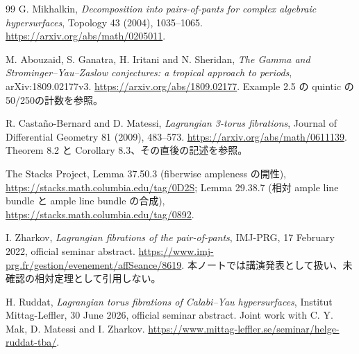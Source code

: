 \documentclass[11pt,a4paper]{article}
\theoremstyle{definition}
\begin{document}
\begin{thebibliography}{99}
G. Mikhalkin,
\emph{Decomposition into pairs-of-pants for complex algebraic hypersurfaces},
Topology 43 (2004), 1035--1065.
\url{https://arxiv.org/abs/math/0205011}.

M. Abouzaid, S. Ganatra, H. Iritani and N. Sheridan,
\emph{The Gamma and Strominger--Yau--Zaslow conjectures: a tropical approach to periods},
arXiv:1809.02177v3.
\url{https://arxiv.org/abs/1809.02177}.
Example 2.5 の quintic の50/250の計数を参照。

R. Castaño-Bernard and D. Matessi,
\emph{Lagrangian 3-torus fibrations},
Journal of Differential Geometry 81 (2009), 483--573.
\url{https://arxiv.org/abs/math/0611139}.
Theorem 8.2 と Corollary 8.3、その直後の記述を参照。

The Stacks Project, Lemma 37.50.3 (fiberwise ampleness の開性),
\url{https://stacks.math.columbia.edu/tag/0D2S};
Lemma 29.38.7 (相対 ample line bundle と ample line bundle の合成),
\url{https://stacks.math.columbia.edu/tag/0892}.

I. Zharkov, \emph{Lagrangian fibrations of the pair-of-pants},
IMJ-PRG, 17 February 2022, official seminar abstract.
\url{https://www.imj-prg.fr/gestion/evenement/affSeance/8619}.
本ノートでは講演発表として扱い、未確認の相対定理として引用しない。

H. Ruddat, \emph{Lagrangian torus fibrations of Calabi--Yau hypersurfaces},
Institut Mittag-Leffler, 30 June 2026, official seminar abstract.
Joint work with C. Y. Mak, D. Matessi and I. Zharkov.
\url{https://www.mittag-leffler.se/seminar/helge-ruddat-tba/}.

\end{thebibliography}
\end{document}
